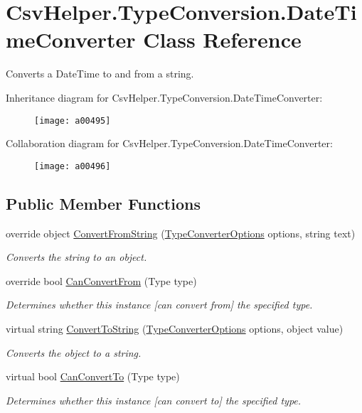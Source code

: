 \hypertarget{a00082}{\section{Csv\-Helper.\-Type\-Conversion.\-Date\-Time\-Converter Class Reference}
\label{a00082}
}


Converts a Date\-Time to and from a string.  




Inheritance diagram for Csv\-Helper.\-Type\-Conversion.\-Date\-Time\-Converter\-:
\nopagebreak
\begin{figure}[H]
\begin{center}
\leavevmode
\texttt{[image: a00495]}
\end{center}
\end{figure}


Collaboration diagram for Csv\-Helper.\-Type\-Conversion.\-Date\-Time\-Converter\-:
\nopagebreak
\begin{figure}[H]
\begin{center}
\leavevmode
\texttt{[image: a00496]}
\end{center}
\end{figure}
\subsection*{Public Member Functions}
\begin{DoxyCompactItemize}
\item 
override object \hyperlink{a00082_a6b1b54cb2d1b200beb8fa3c63e4c064a}{Convert\-From\-String} (\hyperlink{a00158}{Type\-Converter\-Options} options, string text)
\begin{DoxyCompactList}\small\item\em Converts the string to an object. \end{DoxyCompactList}\item 
override bool \hyperlink{a00082_af44239d3bd014b1423fa80f7440bbd25}{Can\-Convert\-From} (Type type)
\begin{DoxyCompactList}\small\item\em Determines whether this instance \mbox{[}can convert from\mbox{]} the specified type. \end{DoxyCompactList}\item 
virtual string \hyperlink{a00086_a36cb2f9b24f15a671293f3a722324c27}{Convert\-To\-String} (\hyperlink{a00158}{Type\-Converter\-Options} options, object value)
\begin{DoxyCompactList}\small\item\em Converts the object to a string. \end{DoxyCompactList}\item 
virtual bool \hyperlink{a00086_acb65bd8c8199d88d5b1629ae35d18514}{Can\-Convert\-To} (Type type)
\begin{DoxyCompactList}\small\item\em Determines whether this instance \mbox{[}can convert to\mbox{]} the specified type. \end{DoxyCompactList}\end{DoxyCompactItemize}


